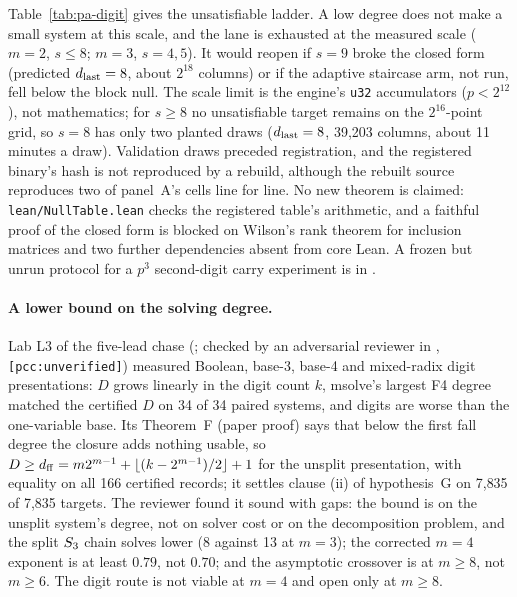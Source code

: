 Table~\ref{tab:pa-digit} gives the unsatisfiable ladder. A low degree does not make a small system at this scale, and the lane is
exhausted at the measured scale ($m=2$, $s\le8$; $m=3$, $s=4,5$). It would
reopen if $s=9$ broke the closed form (predicted $d_{\rm last}=8$, about
$2^{18}$ columns) or if the adaptive staircase arm, not run, fell below the
block null. The scale limit is the engine's \texttt{u32} accumulators
($p<2^{12}$), not mathematics; for $s\ge8$ no unsatisfiable target remains on
the $2^{16}$-point grid, so $s=8$ has only two planted draws ($d_{\rm last}=8$,
39{,}203 columns, about 11 minutes a draw). Validation draws preceded
registration, and the registered binary's hash is not reproduced by a
rebuild, although the rebuilt source reproduces two of panel~A's cells line
for line. No new theorem is claimed: \texttt{lean/NullTable.lean} checks
the registered table's arithmetic, and a faithful proof of the closed form
is blocked on Wilson's rank theorem for inclusion matrices and two further
dependencies absent from core Lean. A frozen but unrun protocol for a $p^3$
second-digit carry experiment is in
.

\paragraph{A lower bound on the solving degree.} Lab L3 of the five-lead
chase (; checked by an
adversarial reviewer in ,
\texttt{[pcc:unverified]}) measured Boolean, base-3, base-4 and mixed-radix
digit presentations: $D$ grows linearly in the digit count $k$, msolve's
largest F4 degree matched the certified $D$ on 34 of 34 paired systems, and
digits are worse than the one-variable base. Its Theorem~F (paper proof)
says that below the first fall degree the closure adds nothing usable, so
$D\ge d_{\rm ff}=m2^{m-1}+\lfloor(k-2^{m-1})/2\rfloor+1$ for the unsplit
presentation, with equality on all 166 certified records; it settles clause
(ii) of hypothesis~G on 7{,}835 of 7{,}835 targets. The reviewer found it
sound with gaps: the bound is on the unsplit system's degree, not on solver
cost or on the decomposition problem, and the split $S_{3}$ chain solves
lower (8 against 13 at $m=3$); the corrected $m=4$ exponent is at least
$0.79$, not $0.70$; and the asymptotic crossover is at $m\ge8$, not $m\ge6$.
The digit route is not viable at $m=4$ and open only at $m\ge8$.

